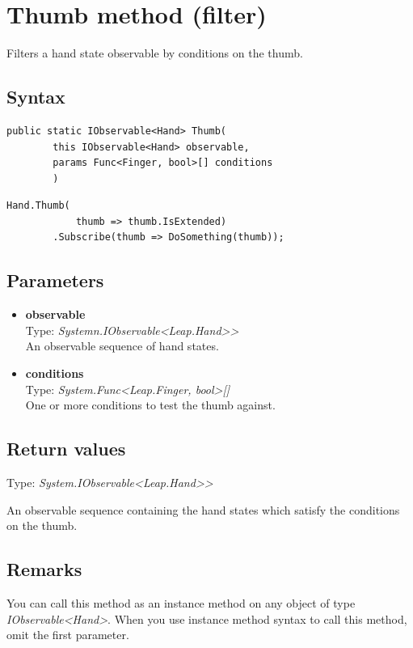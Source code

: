 \documentclass[12pt,a4paper,twoside]{report}
\begin{document}
\section{Thumb method (filter)}
Filters a hand state observable by conditions on the thumb.

\subsection{Syntax}
\begin{lstlisting}[caption=Declaration]
    public static IObservable<Hand> Thumb(
        this IObservable<Hand> observable,
        params Func<Finger, bool>[] conditions
        )
\end{lstlisting}

\begin{lstlisting}[caption=Usage example]
    Hand.Thumb(
            thumb => thumb.IsExtended)
        .Subscribe(thumb => DoSomething(thumb));
\end{lstlisting}

\subsection{Parameters}

\begin{itemize}
    \item \textbf{observable}\\
        Type: \textit{Systemn.IObservable<Leap.Hand>{}>}\\
        An observable sequence of hand states.
    \item \textbf{conditions}\\
        Type: \textit{System.Func<Leap.Finger, bool>[]}\\
        One or more conditions to test the thumb against.
\end{itemize}

\subsection{Return values}
Type: \textit{System.IObservable<Leap.Hand>{}>}

An observable sequence containing the hand states which satisfy the conditions on the thumb.

\subsection{Remarks}
You can call this method as an instance method on any object of type \textit{IObservable<Hand>}. When you use 
instance method syntax to call this method, omit the first parameter.
\end{document}
